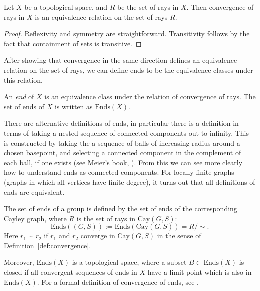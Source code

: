 \begin{proposition}
    Let \(X\) be a topological space, and \(R\) be the set of rays in \(X\). Then convergence of rays in \(X\) is an equivalence relation on the set of rays \(R\).
\end{proposition}

\begin{proof}
    Reflexivity and symmetry are straightforward. Transitivity follows by the fact that containment of sets is transitive.
\end{proof}

After showing that convergence in the same direction defines an equivalence relation on the set of rays, we can define ends to be the equivalence classes under this relation.
\begin{definition}
\label{def:endsofgraph}
    An \emph{end} of \(X\) is an equivalence class under the relation of convergence of rays. The set of ends of \(X\) is written as \(\mathrm{Ends}(X)\).
\end{definition}

\begin{remark}
\label{rem:diffdefsofends}
    There are alternative definitions of ends, in particular there is a definition in terms of taking a nested sequence of connected components out to infinity. This is constructed by taking the a sequence of balls of increasing radius around a chosen basepoint, and selecting a connected component in the complement of each ball, if one exists (see Meier's book, \cite[p.~208]{M08}). From this we can see more clearly how to understand ends as connected components. For locally finite graphs (graphs in which all vertices have finite degree), it turns out that all definitions of ends are equivalent.
\end{remark}

\begin{definition}
     The set of ends of a group is defined by the set of ends of the corresponding Cayley graph, where \(R\) is the set of rays in \(\mathrm{Cay}(G,S)\):
    \[
        \mathrm{Ends}((G,S)) := \mathrm{Ends}(\mathrm{Cay}(G,S)) = R/\sim.
    \]
    Here \(r_1 \sim r_2\) if \(r_1\) and \(r_2\) converge in \(\mathrm{Cay}(G,S)\) in the sense of Definition~\ref{def:convergence}.
\end{definition}

\begin{remark}
    Moreover, \(\mathrm{Ends}(X)\) is a topological space, where a subset \(B \subset \mathrm{Ends}(X)\) is closed if all convergent sequences of ends in \(X\) have a limit point which is also in \(\mathrm{Ends}(X)\). For a formal definition of convergence of ends, see \cite[p.~144]{BrHa11}.
\end{remark}

